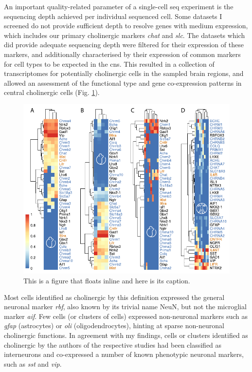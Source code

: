 An important quality-related parameter of a single-cell \ac{seq} experiment is the sequencing depth achieved per individual sequenced cell. Some datasets I screened do not provide sufficient depth to resolve genes with medium expression, which includes our primary cholinergic markers \textit{\ac{chat}} and \textit{\ac{slc}}. The datasets which did provide adequate sequencing depth were filtered for their expression of these markers, and additionally characterised by their expression of common markers for cell types to be expected in the \ac{cns}. This resulted in a collection of transcriptomes for potentially cholinergic cells in the sampled brain regions, and allowed an assessment of the functional type and gene co-expression patterns in central cholinergic cells (Fig. \ref{fig:singlecell}).

\begin{figure}
\includegraphics[width=\textwidth]{figures/singlecell}
\caption[Short figure name.]{This is a figure that floats inline and here is its caption.
\label{fig:singlecell}}
\end{figure}

Most cells identified as cholinergic by this definition expressed the general neuronal marker \textit{\acs{rbf}}, also known by its trivial name NeuN, but not the microglial marker \textit{\acs{aif}}. Few cells (or clusters of cells) expressed non-neuronal markers such as \textit{\acs{gfap}} (astrocytes) or \textit{\acs{oli}} (oligodendrocytes), hinting at sparse non-neuronal cholinergic functions. In agreement with my findings, cells or clusters identified as cholinergic by the authors of the respective studies had been classified as interneurons and co-expressed a number of known phenotypic neuronal markers, such as \textit{\ac{sst}} and \textit{\ac{vip}}.

